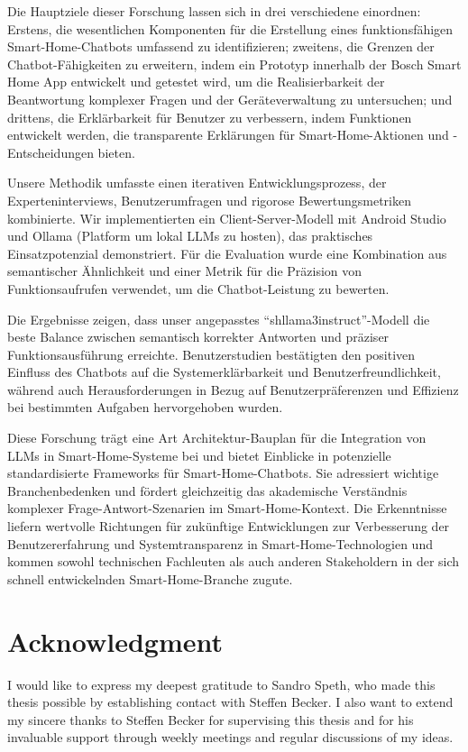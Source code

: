 \documentclass[
  a4paper,  %
  twoside,  %
  bibliography=totoc,
  headsepline,
  cleardoublepage=empty,
  parskip=half,
  draft=false
]{scrbook}
\begin{document}
Die Hauptziele dieser Forschung lassen sich in drei verschiedene einordnen: Erstens, die wesentlichen Komponenten für die Erstellung eines funktionsfähigen Smart-Home-Chatbots umfassend zu identifizieren; zweitens, die Grenzen der Chatbot-Fähigkeiten zu erweitern, indem ein Prototyp innerhalb der Bosch Smart Home App entwickelt und getestet wird, um die Realisierbarkeit der Beantwortung komplexer Fragen und der Geräteverwaltung zu untersuchen; und drittens, die Erklärbarkeit für Benutzer zu verbessern, indem Funktionen entwickelt werden, die transparente Erklärungen für Smart-Home-Aktionen und -Entscheidungen bieten.

Unsere Methodik umfasste einen iterativen Entwicklungsprozess, der Experteninterviews, Benutzerumfragen und rigorose Bewertungsmetriken kombinierte. Wir implementierten ein Client-Server-Modell mit Android Studio und Ollama (Platform um lokal LLMs zu hosten), das praktisches Einsatzpotenzial demonstriert. Für die Evaluation wurde eine Kombination aus semantischer Ähnlichkeit und einer Metrik für die Präzision von Funktionsaufrufen verwendet, um die Chatbot-Leistung zu bewerten.

Die Ergebnisse zeigen, dass unser angepasstes ``shllama3instruct''-Modell die beste Balance zwischen semantisch korrekter Antworten und präziser Funktionsausführung erreichte. Benutzerstudien bestätigten den positiven Einfluss des Chatbots auf die Systemerklärbarkeit und Benutzerfreundlichkeit, während auch Herausforderungen in Bezug auf Benutzerpräferenzen und Effizienz bei bestimmten Aufgaben hervorgehoben wurden.

Diese Forschung trägt eine Art Architektur-Bauplan für die Integration von LLMs in Smart-Home-Systeme bei und bietet Einblicke in potenzielle standardisierte Frameworks für Smart-Home-Chatbots. Sie adressiert wichtige Branchenbedenken und fördert gleichzeitig das akademische Verständnis komplexer Frage-Antwort-Szenarien im Smart-Home-Kontext. Die Erkenntnisse liefern wertvolle Richtungen für zukünftige Entwicklungen zur Verbesserung der Benutzererfahrung und Systemtransparenz in Smart-Home-Technologien und kommen sowohl technischen Fachleuten als auch anderen Stakeholdern in der sich schnell entwickelnden Smart-Home-Branche zugute.
\cleardoublepage


\section*{Acknowledgment}
I would like to express my deepest gratitude to Sandro Speth, who made this thesis possible by establishing contact with Steffen Becker. I also want to extend my sincere thanks to Steffen Becker for supervising this thesis and for his invaluable support through weekly meetings and regular discussions of my ideas.
\end{document}
